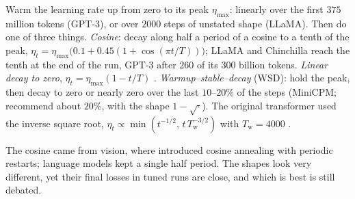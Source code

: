 \begin{refsection}
\begin{practice}
Warm the learning rate up from zero to its peak $\eta_{\max}$: linearly over the first $375$ million tokens (GPT-3), or over $2000$ steps of unstated shape (LLaMA). Then do one of three things. \emph{Cosine}: decay along half a period of a cosine to a tenth of the peak, $\eta_t=\eta_{\max}\bigl(0.1+0.45(1+\cos(\pi t/T))\bigr)$; LLaMA and Chinchilla reach the tenth at the end of the run, GPT-3 after $260$ of its $300$ billion tokens. \emph{Linear decay to zero}, $\eta_t=\eta_{\max}(1-t/T)$ \parencite{DefazioEtAl2023,BergsmaEtAl2025}. \emph{Warmup--stable--decay} (WSD): hold the peak, then decay to zero or nearly zero over the last $10$--$20\%$ of the steps (MiniCPM; \textcite{HageleEtAl2024} recommend about $20\%$, with the shape $1-\sqrt{\cdot}$). The original transformer used the inverse square root, $\eta_t\propto\min(t^{-1/2},\,t\,T_{\mathrm w}^{-3/2})$ with $T_{\mathrm w}=4000$ \parencite{VaswaniEtAl2017}.
\end{practice}

The cosine came from vision, where \textcite{LoshchilovHutter2017} introduced cosine annealing with periodic restarts; language models kept a single half period. The shapes look very different, yet their final losses in tuned runs are close, and which is best is still debated.



\end{refsection}
